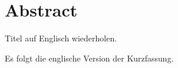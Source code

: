 
\thispagestyle{plain}

\section*{Abstract}
Titel auf Englisch wiederholen.

Es folgt die englische Version der Kurzfassung.

\switchlanguage{\lang} %
